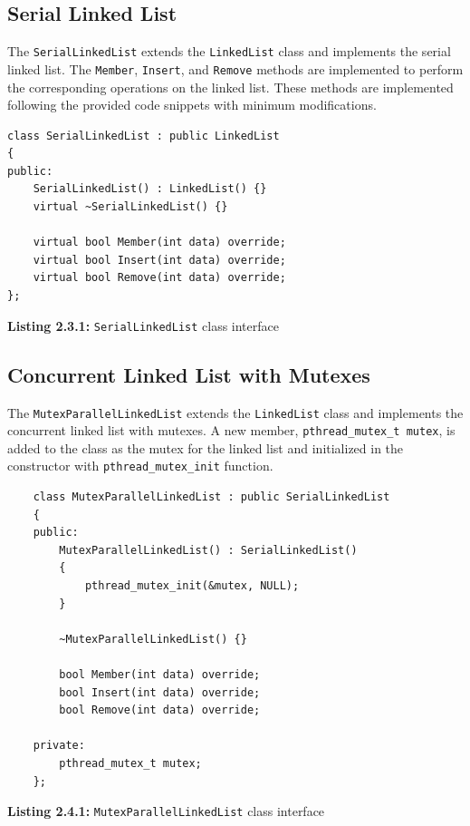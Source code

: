 \documentclass[a4paper,12pt]{article}
\begin{document}
\subsection{Serial Linked List}

The \lstinline|SerialLinkedList| extends the \lstinline|LinkedList| class and implements the serial linked list. The \lstinline|Member|, \lstinline|Insert|, and \lstinline|Remove| methods are implemented to perform the corresponding operations on the linked list. These methods are implemented following the provided code snippets with minimum modifications.

\begin{lstlisting}
class SerialLinkedList : public LinkedList
{
public:
    SerialLinkedList() : LinkedList() {}
    virtual ~SerialLinkedList() {}

    virtual bool Member(int data) override;
    virtual bool Insert(int data) override;
    virtual bool Remove(int data) override;
};
\end{lstlisting}
\begin{center}
    \textbf{Listing 2.3.1:} \lstinline|SerialLinkedList| class interface
\end{center}

\subsection{Concurrent Linked List with Mutexes}

The \lstinline|MutexParallelLinkedList| extends the \lstinline|LinkedList| class and implements the concurrent linked list with mutexes. A new member, \lstinline|pthread_mutex_t mutex|, is added to the class as the mutex for the linked list and initialized in the constructor with \lstinline|pthread_mutex_init| function.

\begin{lstlisting}
    class MutexParallelLinkedList : public SerialLinkedList
    {
    public:
        MutexParallelLinkedList() : SerialLinkedList()
        {
            pthread_mutex_init(&mutex, NULL);
        }
    
        ~MutexParallelLinkedList() {}
    
        bool Member(int data) override;
        bool Insert(int data) override;
        bool Remove(int data) override;
    
    private:
        pthread_mutex_t mutex;
    };
\end{lstlisting}
\begin{center}
    \textbf{Listing 2.4.1:} \lstinline|MutexParallelLinkedList| class interface
\end{center}
\end{document}

